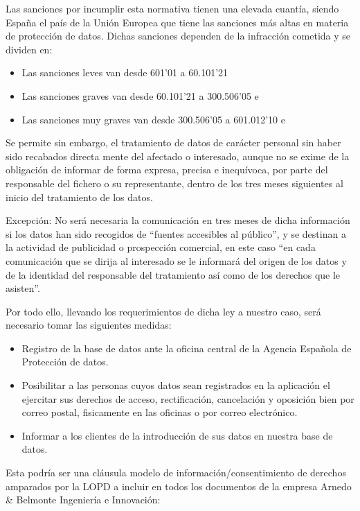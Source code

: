 Las sanciones por incumplir esta normativa tienen una elevada cuantía, siendo
España el país de la Unión Europea que tiene las sanciones más altas en materia
de protección de datos. Dichas sanciones dependen de la infracción cometida y se
dividen en:

\begin{itemize}
\item Las sanciones leves van desde 601’01 a 60.101’21 
\item Las sanciones graves van desde 60.101’21 a 300.506’05 e
\item Las sanciones muy graves van desde 300.506’05 a 601.012’10 e
\end{itemize}

Se permite sin embargo, el tratamiento de datos de carácter personal sin haber
sido recabados directa mente del afectado o interesado, aunque no se exime de la
obligación de informar de forma expresa, precisa e inequívoca, por parte del
responsable del fichero o su representante, dentro de los tres meses siguientes
al inicio del tratamiento de los datos.

Excepción: No será necesaria la comunicación en tres meses de dicha información
si los datos han sido recogidos de ``fuentes accesibles al público'', y se
destinan a la actividad de publicidad o prospección comercial, en este caso ``en
cada comunicación que se dirija al interesado se le informará del origen de los
datos y de la identidad del responsable del tratamiento así como de los derechos
que le asisten''.

Por todo ello, llevando los requerimientos de dicha ley a nuestro caso, será
necesario tomar las siguientes
medidas:

\begin{itemize}
\item Registro de la base de datos ante la oficina central de la Agencia
Española de Protección de datos.
\item Posibilitar a las personas cuyos datos sean registrados en la aplicación
el ejercitar sus derechos de acceso, rectificación, cancelación y oposición bien
por correo postal, fisicamente en las oficinas o por correo electrónico.
\item Informar a los clientes de la introducción de sus datos en nuestra base de
datos.
\end{itemize}

Esta podría ser una cláusula modelo de información/consentimiento de derechos
amparados por la LOPD a incluir en todos los documentos de la empresa Arnedo \&
Belmonte Ingeniería e Innovación:

